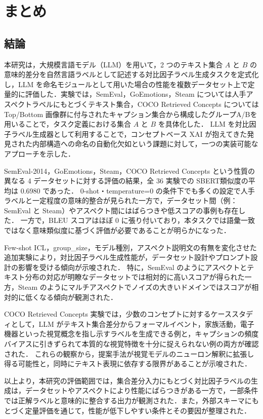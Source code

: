\chapter{まとめ}
\section{結論}

本研究は，大規模言語モデル（LLM）を用いて，2 つのテキスト集合 $A$ と $B$ の意味的差分を自然言語ラベルとして記述する対比因子ラベル生成タスクを定式化し，LLM を命名モジュールとして用いた場合の性能を複数データセット上で定量的に評価した．実験では，SemEval，GoEmotions，Steam については人手アスペクトラベルにもとづくテキスト集合，COCO Retrieved Concepts については Top/Bottom 画像群に付与されたキャプション集合から構成したグループA/Bを用いることで，タスク定義における集合 $A$ と $B$ を具体化した．
LLM を対比因子ラベル生成器として利用することで，コンセプトベース XAI が抱えてきた発見された内部構造への命名の自動化欠如という課題に対して，一つの実装可能なアプローチを示した．

SemEval-2014，GoEmotions，Steam，COCO Retrieved Concepts という性質の異なる 4 データセットに対する評価の結果，全 36 実験での SBERT類似度の平均は 0.6980 であった．
0-shot・temperature=0 の条件下でも多くの設定で人手ラベルと一定程度の意味的整合が見られた一方で，データセット間（例：SemEval と Steam）やアスペクト間にはばらつきや低スコアの事例も存在した．
一方で，BLEU スコアはほぼ 0 に張り付いており，本タスクでは語彙一致ではなく意味類似度に基づく評価が必要であることが明らかになった．

Few-shot ICL，group\_size，モデル種別，アスペクト説明文の有無を変化させた追加実験により，対比因子ラベル生成性能が，データセット設計やプロンプト設計の影響を受ける傾向が示唆された．
特に，SemEval のようにアスペクトとテキスト分布の対応が明瞭なデータセットでは相対的に高いスコアが得られた一方，Steam のようにマルチアスペクトでノイズの大きいドメインではスコアが相対的に低くなる傾向が観測された．

COCO Retrieved Concepts 実験では，少数のコンセプトに対するケーススタディとして，LLM がテキスト集合差分からフォーマルイベント，家族活動，電子機器といった視覚概念を指し示すラベルを生成できる例と，キャプションの頻度バイアスに引きずられて本質的な視覚特徴を十分に捉えられない例の両方が確認された．
これらの観察から，提案手法が視覚モデルのニューロン解釈に拡張し得る可能性と，同時にテキスト表現に依存する限界があることが示唆された．

以上より，本研究の評価範囲では，集合差分入力にもとづく対比因子ラベルの生成は，データセットやアスペクトにより性能にばらつきがある一方で，一部条件では正解ラベルと意味的に整合する出力が観測された．また，外部スキーマにもとづく定量評価を通じて，性能が低下しやすい条件とその要因が整理された．

